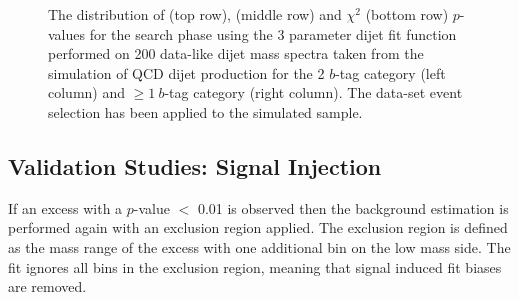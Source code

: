 \begin{figure}[!thb]
\begin{center}
  \end{center}
  \caption{
    The distribution of \bh{} (top row),  \dhunt{} (middle row) and $\chi^{2}$ (bottom row) \mbox{$p$-value}s for
    the search phase using the 3 parameter dijet fit function performed on
    200 data-like dijet mass spectra taken from the simulation of QCD dijet production
    for the 2 $b$-tag category (left column) and $\geq1~b$-tag category (right column).
    The \summer{} data-set event selection has been applied to the simulated sample.
  \label{fig:pValueHists}}
\end{figure}

\subsection{Validation Studies: Signal Injection}
\label{sec:bkg-summer_sigInj}

If an excess with a  \bh{} $p$-value $<$ 0.01 is observed then the background estimation is
performed again with an exclusion region applied.
The exclusion region is defined as the mass range of the excess with one additional bin on the low mass side.
The fit ignores all bins in the exclusion region, meaning that signal induced fit biases are removed.

